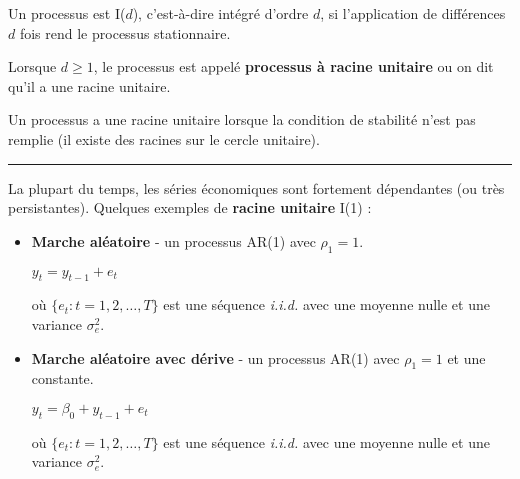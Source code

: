   \begin{f}

Un processus est I($d$), c'est-à-dire intégré d'ordre $d$, si l'application de différences $d$ fois rend le processus stationnaire.

Lorsque $d \geq 1$, le processus est appelé \textbf{processus à racine unitaire} ou on dit qu'il a une racine unitaire.

Un processus a une racine unitaire lorsque la condition de stabilité n'est pas remplie (il existe des racines sur le cercle unitaire).

\end{f}  \hrule  

\begin{f}

La plupart du temps, les séries économiques sont fortement dépendantes (ou très persistantes). Quelques exemples de \textbf{racine unitaire} I(1) :

\begin{itemize}[leftmargin=*]
	\item \textbf{Marche aléatoire} - un processus AR(1) avec $\rho_{1} = 1$.
	
	\begin{center}
		$y_{t} = y_{t - 1} + e_{t}$
	\end{center}
	
	où $\lbrace e_{t} : t = 1, 2, \ldots, T \rbrace$ est une séquence \textsl{i.i.d.} avec une moyenne nulle et une variance $\sigma^{2}_{e}$.
	
	\item \textbf{Marche aléatoire avec dérive} - un processus AR(1) avec $\rho_{1} = 1$ et une constante.
	
	\begin{center}
		$y_{t} = \beta_{0} + y_{t - 1} + e_{t}$
	\end{center}
	
	où $\lbrace e_{t} : t = 1, 2, \ldots, T \rbrace$ est une séquence \textsl{i.i.d.} avec une moyenne nulle et une variance $\sigma^{2}_{e}$.
\end{itemize}

\end{f} 

